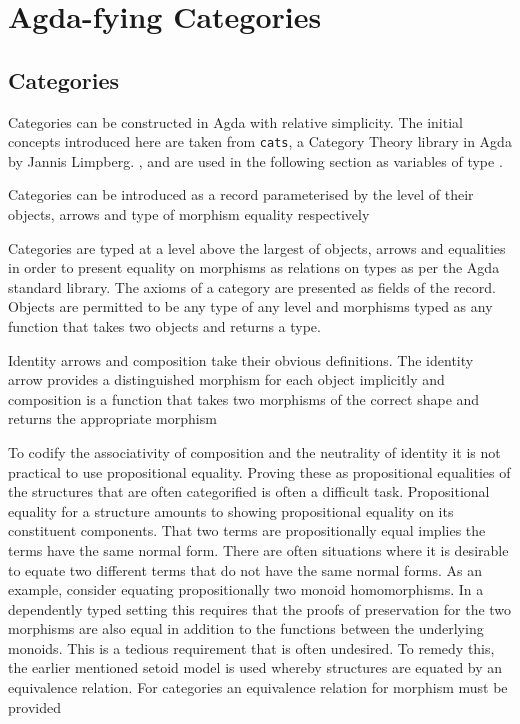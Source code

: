 \section{Agda-fying Categories}

\subsection{Categories}

Categories can be constructed in Agda with relative simplicity. The initial
concepts introduced here are taken from \verb|cats|, a Category Theory library
in Agda by Jannis Limpberg. ,  and 
are used in the following section as variables of type .

Categories can be introduced as a record parameterised by the level of their
objects, arrows and type of morphism equality respectively

Categories are typed at a level above the largest of objects, arrows and
equalities in order to present equality on morphisms as relations on types as
per the Agda standard library. The axioms of a category are presented as fields
of the record. Objects are permitted to be any type of any level and morphisms
typed as any function that takes two objects and returns a type.

Identity arrows and composition take their obvious definitions. The identity
arrow provides a distinguished morphism for each object implicitly and
composition is a function that takes two morphisms of the correct shape and
returns the appropriate morphism

To codify the associativity of composition and the neutrality of identity it is
not practical to use propositional equality. Proving these as propositional
equalities of the structures that are often categorified is often a difficult
task. Propositional equality for a structure amounts to showing propositional
equality on its constituent components. That two terms are propositionally equal
implies the terms have the same normal form. There are often situations where it
is desirable to equate two different terms that do not have the same normal
forms. As an example, consider equating propositionally two monoid
homomorphisms. In a dependently typed setting this requires that the proofs of
preservation for the two morphisms are also equal in addition to the functions
between the underlying monoids. This is a tedious requirement that is often
undesired. To remedy this, the earlier mentioned setoid model is
used whereby structures are equated by an equivalence relation. For
categories an equivalence relation for morphism must be provided

